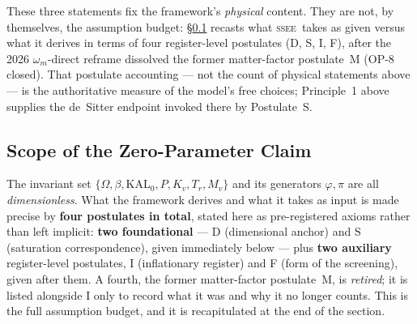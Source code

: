 \documentclass[12pt,a4paper]{article}
\newcommand{\SSEE}{\ifmmode\mathrm{SSEE}\else\textsc{ssee}\fi}
\newcommand{\KALz}{\mathrm{KAL}_0}
\begin{document}
These three statements fix the framework's \emph{physical} content. They are
not, by themselves, the assumption budget: §\ref{sec:scope} recasts what \SSEE\
takes as given versus what it derives in terms of four register-level postulates
(D, S, I, F), after the 2026 $\omega_m$-direct reframe dissolved the former
matter-factor postulate~M (OP-8 closed). That postulate accounting --- not the
count of physical statements above --- is the authoritative measure of the model's
free choices; Principle~1 above supplies the de~Sitter endpoint invoked there by
Postulate~S.

\subsection{Scope of the Zero-Parameter Claim}
\label{sec:scope}

The invariant set $\{\Omega,\beta,\KALz,P,K_v,T_r,M_v\}$ and its generators
$\varphi,\pi$ are all \emph{dimensionless}. What the framework derives and what
it takes as input is made precise by \textbf{four postulates in total}, stated
here as pre-registered axioms rather than left implicit: \textbf{two
foundational} --- D (dimensional anchor) and S (saturation correspondence),
given immediately below --- plus \textbf{two auxiliary} register-level
postulates, I (inflationary register) and F (form of the screening), given
after them. A fourth, the former
matter-factor postulate~M, is \emph{retired}; it is listed alongside I only to
record what it was and why it no longer counts. This is the full assumption
budget, and it is recapitulated at the end of the section.
\end{document}
